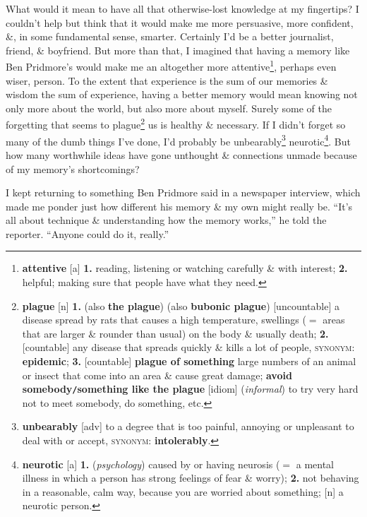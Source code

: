 \documentclass[oneside]{book}
\numberwithin{equation}{section}
\begin{document}
What would it mean to have all that otherwise-lost knowledge at my fingertips? I couldn't help but think that it would make me more persuasive, more confident, \&, in some fundamental sense, smarter. Certainly I'd be a better journalist, friend, \& boyfriend. But more than that, I imagined that having a memory like Ben Pridmore's would make me an altogether more attentive\footnote{\textbf{attentive} [a] \textbf{1.} reading, listening or watching carefully \& with interest; \textbf{2.} helpful; making sure that people have what they need.}, perhaps even wiser, person. To the extent that experience is the sum of our memories \& wisdom the sum of experience, having a better memory would mean knowing not only more about the world, but also more about myself. Surely some of the forgetting that seems to plague\footnote{\textbf{plague} [n] \textbf{1.} (also \textbf{the plague}) (also \textbf{bubonic plague}) [uncountable] a disease spread by rats that causes a high temperature, swellings ($=$ areas that are larger \& rounder than usual) on the body \& usually death; \textbf{2.} [countable] any disease that spreads quickly \& kills a lot of people, \textsc{synonym}: \textbf{epidemic}; \textbf{3.} [countable] \textbf{plague of something} large numbers of an animal or insect that come into an area \& cause great damage; \textbf{avoid somebody\texttt{/}something like the plague} [idiom] (\textit{informal}) to try very hard not to meet somebody, do something, etc.} us is healthy \& necessary. If I didn't forget so many of the dumb things I've done, I'd probably be unbearably\footnote{\textbf{unbearably} [adv] to a degree that is too painful, annoying or unpleasant to deal with or accept, \textsc{synonym}: \textbf{intolerably}.} neurotic\footnote{\textbf{neurotic} [a] \textbf{1.} (\textit{psychology}) caused by or having neurosis ($=$ a mental illness in which a person has strong feelings of fear \& worry); \textbf{2.} not behaving in a reasonable, calm way, because you are worried about something; [n] a neurotic person.}. But how many worthwhile ideas have gone unthought \& connections unmade because of my memory's shortcomings?

I kept returning to something Ben Pridmore said in a newspaper interview, which made me ponder just how different his memory \& my own might really be. ``It's all about technique \& understanding how the memory works,'' he told the reporter. ``Anyone could do it, really.''
\end{document}
